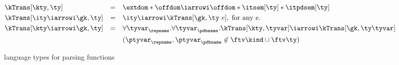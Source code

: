 




\begin{figure}
\small
\fbox{$\kTrans[\gk,\ty] = \ity$} 
    
\begin{align*}
  &\kTrans[\kty,\ty] & = & \quad \extdom * \offdom \iarrowi \offdom * \itsem[\ty] * \itpdsem[\ty]
   \\
   &\kTrans[\ity \iarrowi \gk,\ty] & = & \quad \ity \iarrowi \kTrans[\gk,\ty\ e],
   \; \mbox{for any e}.
   \\
   &\kTrans[\kty \iarrowi \gk,\ty] & = & \quad 
      \forall\tyvar_\repname.\forall\tyvar_\pdbname.
         \kTrans[\kty,\tyvar] \iarrowi \kTrans[\gk,\ty \tyvar] \\
         & & & \quad (\ptyvar_\repname, \ptyvar_\pdbname \not \in \ftv \kind \cup
         \ftv \ty)
\end{align*}  
  \caption{\Implang{} language types for parsing functions}
  \label{fig:parser-types}
\end{figure}

